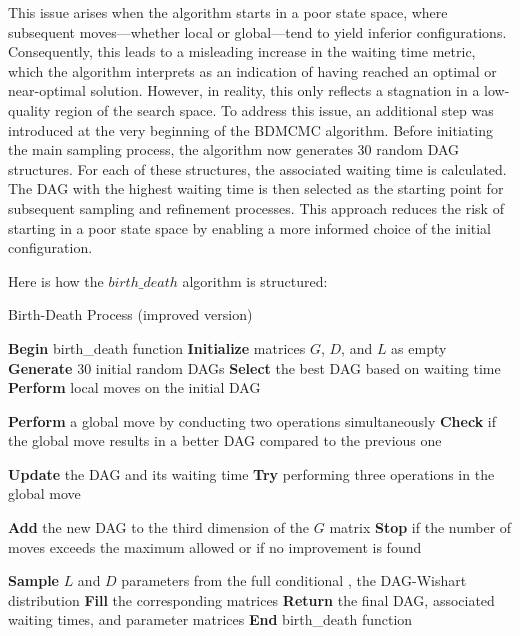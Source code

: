 \documentclass{report}
\begin{document}
This issue arises when the algorithm starts in a poor state space, where subsequent moves—whether local or global—tend to yield inferior configurations. Consequently, this leads to a misleading increase in the waiting time metric, which the algorithm interprets as an indication of having reached an optimal or near-optimal solution. However, in reality, this only reflects a stagnation in a low-quality region of the search space. 
To address this issue, an additional step was introduced at the very beginning of the BDMCMC algorithm. Before initiating the main sampling process, the algorithm now generates 30 random DAG structures. For each of these structures, the associated waiting time is calculated. The DAG with the highest waiting time is then selected as the starting point for subsequent sampling and refinement processes. This approach reduces the risk of starting in a poor state space by enabling a more informed choice of the initial configuration. 

Here is how the $birth\_death$ algorithm is structured:

\begin{algorithm}[H]
	\caption{Birth-Death Process (improved version)}
	\begin{algorithmic}[1]
		\State \textbf{Begin} birth\_death function
		\State \textbf{Initialize} matrices $G$, $D$, and $L$ as empty
		\State \textbf{Generate} 30 initial random DAGs
		\State \textbf{Select} the best DAG based on waiting time
		\State \textbf{Perform} local moves on the initial DAG
		
		\State \textbf{Perform} a global move by conducting two operations simultaneously
		\State \textbf{Check} if the global move results in a better DAG compared to the previous one
		
		\State \textbf{Update} the DAG and its waiting time
		\Else
		\State \textbf{Try} performing three operations in the global move
		\EndIf
		
		\State \textbf{Add} the new DAG to the third dimension of the $G$ matrix
		\State \textbf{Stop} if the number of moves exceeds the maximum allowed or if no improvement is found
		\EndWhile
		
		\State \textbf{Sample} $L$ and $D$ parameters from the full conditional , the DAG-Wishart distribution
		\State \textbf{Fill} the corresponding matrices
		\State \textbf{Return} the final DAG, associated waiting times, and parameter matrices
		\State \textbf{End} birth\_death function
	\end{algorithmic}
\end{algorithm}
\end{document}
